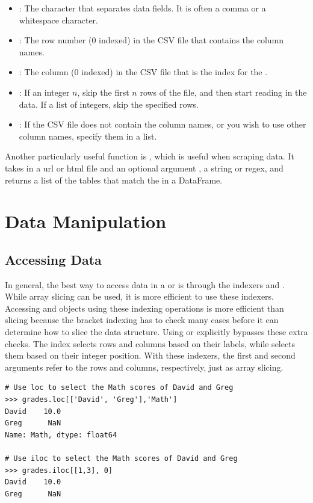 \begin{itemize}
\item {}:
The character that separates data fields. It is often a
comma or a whitespace character.
\item {}: The row number (0 indexed) in the CSV file that contains the column names.
 \item {}: The column (0 indexed) in the CSV file that is the index for the
.
 \item {}:
If an integer $n$, skip the first $n$ rows of the file, and then start reading
in the data.
If a list of integers, skip the specified rows.
 \item {}:
If the CSV file does not contain the column names, or you wish to use other
column names, specify them in a list.
\end{itemize}

Another particularly useful function is , which is useful when scraping data.
It takes in a url or html file and an optional argument , a string or regex, and returns a list of the tables that match the  in a DataFrame.

\section*{Data Manipulation}

\subsection*{Accessing Data}

In general, the best way to access data in a  or  is through the indexers  and .
While array slicing can be used, it is more efficient to use these indexers.
Accessing  and  objects using these indexing operations is more efficient than slicing because the bracket indexing has to check many cases before it can determine how to slice the data structure.
Using  or  explicitly bypasses these extra checks.
The  index selects rows and columns based on their labels, while  selects them based on their integer position.
With these indexers, the first and second arguments refer to the rows and columns, respectively, just as array slicing.

\begin{lstlisting}
# Use loc to select the Math scores of David and Greg
>>> grades.loc[['David', 'Greg'],'Math']
David    10.0
Greg      NaN
Name: Math, dtype: float64

# Use iloc to select the Math scores of David and Greg
>>> grades.iloc[[1,3], 0]
David    10.0
Greg      NaN
\end{lstlisting}

